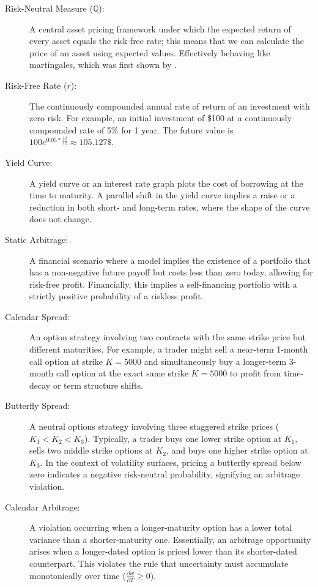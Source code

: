 \documentclass[12pt,oneside]{report}
\theoremstyle{definition}
\theoremstyle{remark}
\begin{document}
\begin{description}
    \item[Risk-Neutral Measure ($\mathbb{Q}$):] A central asset pricing framework under which the expected return of every asset equals the risk-free rate; this means that we can calculate the price of an asset using expected values. Effectively behaving like martingales, which was first shown by \citet{harrison1979martingales}.
    \item[Risk-Free Rate ($r$):] The continuously compounded annual rate of return of an investment with zero risk. For example, an initial investment of \$100 at a continuously compounded rate of 5\% for 1 year. The future value is $100e^{0.05 * \frac{12}{12}} \approx 105.127\$$.
    \item[Yield Curve:] A yield curve or an interest rate graph plots the cost of borrowing at the time to maturity. A parallel shift in the yield curve implies a raise or a reduction in both short- and long-term rates, where the shape of the curve does not change.
    \item[Static Arbitrage:] A financial scenario where a model implies the existence of a portfolio that has a non-negative future payoff but costs less than zero today, allowing for risk-free profit. Financially, this implies a self-financing portfolio with a strictly positive probability of a riskless profit.
    \item[Calendar Spread:] An option strategy involving two contracts with the same strike price but different maturities. For example, a trader might sell a near-term 1-month call option at strike $K = 5000$ and simultaneously buy a longer-term 3-month call option at the exact same strike $K = 5000$ to profit from time-decay or term structure shifts.
    \item[Butterfly Spread:] A neutral options strategy involving three staggered strike prices ($K_1 < K_2 < K_3$). Typically, a trader buys one lower strike option at $K_1$, sells two middle strike options at $K_2$, and buys one higher strike option at $K_3$. In the context of volatility surfaces, pricing a butterfly spread below zero indicates a negative risk-neutral probability, signifying an arbitrage violation.
    \item[Calendar Arbitrage:] A violation occurring when a longer-maturity option has a lower total variance than a shorter-maturity one. Essentially, an arbitrage opportunity arises when a longer-dated option is priced lower than its shorter-dated counterpart. This violates the rule that uncertainty must accumulate monotonically over time ($\frac{\partial w}{\partial T} \ge 0$).

\end{description}
\end{document}
